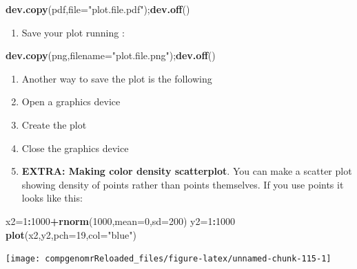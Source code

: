 \documentclass[12pt,]{krantz}
\newenvironment{Shaded}{\begin{snugshade}}{\end{snugshade}}
\newcommand{\DataTypeTok}[1]{\textcolor[rgb]{0.13,0.29,0.53}{#1}}
\newcommand{\DecValTok}[1]{\textcolor[rgb]{0.00,0.00,0.81}{#1}}
\newcommand{\KeywordTok}[1]{\textcolor[rgb]{0.13,0.29,0.53}{\textbf{#1}}}
\newcommand{\NormalTok}[1]{#1}
\newcommand{\OperatorTok}[1]{\textcolor[rgb]{0.81,0.36,0.00}{\textbf{#1}}}
\newcommand{\StringTok}[1]{\textcolor[rgb]{0.31,0.60,0.02}{#1}}
\providecommand{\tightlist}{%
  \setlength{\itemsep}{0pt}\setlength{\parskip}{0pt}}
\begin{document}
\begin{Shaded}
\begin{Highlighting}[]
\KeywordTok{dev.copy}\NormalTok{(pdf,}\DataTypeTok{file=}\StringTok{"plot.file.pdf"}\NormalTok{);}\KeywordTok{dev.off}\NormalTok{()}
\end{Highlighting}
\end{Shaded}

\begin{enumerate}
\def\labelenumi{\arabic{enumi}.}
\setcounter{enumi}{43}
\tightlist
\item
  Save your plot running :
\end{enumerate}

\begin{Shaded}
\begin{Highlighting}[]
\KeywordTok{dev.copy}\NormalTok{(png,}\DataTypeTok{filename=}\StringTok{"plot.file.png"}\NormalTok{);}\KeywordTok{dev.off}\NormalTok{()}
\end{Highlighting}
\end{Shaded}

\begin{enumerate}
\def\labelenumi{\arabic{enumi}.}
\setcounter{enumi}{43}
\item
  Another way to save the plot is the following
\item
  Open a graphics device
\item
  Create the plot
\item
  Close the graphics device
\item
  \textbf{EXTRA: Making color density scatterplot}. You can make a scatter plot showing density
  of points rather than points themselves. If you use points it looks like this:
\end{enumerate}

\begin{Shaded}
\begin{Highlighting}[]
\NormalTok{x2=}\DecValTok{1}\OperatorTok{:}\DecValTok{1000}\OperatorTok{+}\KeywordTok{rnorm}\NormalTok{(}\DecValTok{1000}\NormalTok{,}\DataTypeTok{mean=}\DecValTok{0}\NormalTok{,}\DataTypeTok{sd=}\DecValTok{200}\NormalTok{)}
\NormalTok{y2=}\DecValTok{1}\OperatorTok{:}\DecValTok{1000}
\KeywordTok{plot}\NormalTok{(x2,y2,}\DataTypeTok{pch=}\DecValTok{19}\NormalTok{,}\DataTypeTok{col=}\StringTok{"blue"}\NormalTok{)}
\end{Highlighting}
\end{Shaded}

\begin{center}\texttt{[image: compgenomrReloaded\_files/figure-latex/unnamed-chunk-115-1]} \end{center}
\end{document}
